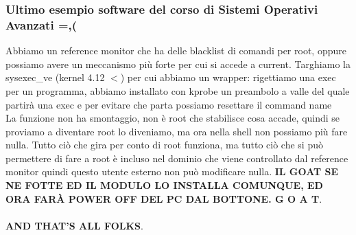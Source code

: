 \documentclass[12pt, oneside]{extbook}
\begin{document}
\subsubsection*{Ultimo esempio software del corso di Sistemi Operativi Avanzati =,(}
Abbiamo un reference monitor che ha delle blacklist di comandi per root, oppure possiamo avere un meccanismo più forte per cui si accede a current. Targhiamo la sysexec\_ve (kernel 4.12 $<$) per cui abbiamo un wrapper: rigettiamo una exec per un programma, abbiamo installato con kprobe un preambolo a valle del quale partirà una exec e per evitare che parta possiamo resettare il command name\\La funzione non ha smontaggio, non è root che stabilisce cosa accade, quindi se proviamo a diventare root lo diveniamo, ma ora nella shell non possiamo più fare nulla. Tutto ciò che gira per conto di root funziona, ma tutto ciò che si può permettere di fare a root è incluso nel dominio che viene controllato dal reference monitor quindi questo utente esterno non può modificare nulla. \textbf{\textsf{IL GOAT SE NE FOTTE ED IL MODULO LO INSTALLA COMUNQUE, ED ORA FARÀ POWER OFF DEL PC DAL BOTTONE. G O A T}}.
\\\\
{\Huge
\textbf{\textsf{AND THAT'S ALL FOLKS}}}.






\newpage
\end{document}
